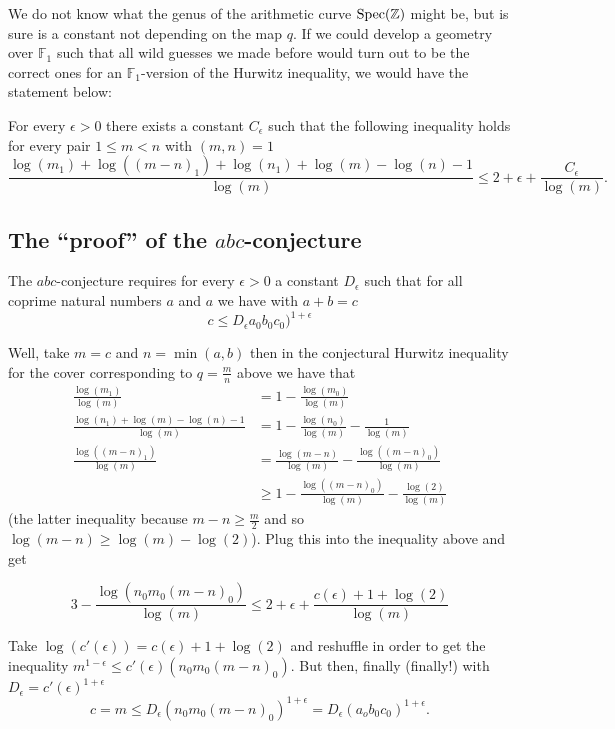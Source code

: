 We do not know what the genus of the arithmetic curve $\operatorname{Spec}(\mathbb{Z})$ might be, but is sure is a constant not depending on the map $q$. If we could develop a geometry over $\mathbb{F}_1$ such that all wild guesses we made before would turn out to be the correct ones for an $\mathbb{F}_1$-version of the Hurwitz inequality, we would have the statement below:

For every $\epsilon > 0$ there exists a constant $C_\epsilon$ such that the following inequality holds for every pair $1 \leq m < n$ with $(m,n)=1$
\begin{equation}
  \frac{\log(m_1) + \log((m-n)_1) + \log(n_1) + \log(m)-\log(n)-1}{\log(m)} \leq 2 + \epsilon + \frac{C_\epsilon}{\log(m)}.
\end{equation}

\subsection{The ``proof'' of the $abc$-conjecture}

The $abc$-conjecture requires for every $\epsilon > 0$ a constant $D_\epsilon$ such that for all coprime natural numbers $a$ and $a$ we have with $a+b=c$
\begin{equation}
c \leq D_\epsilon a_0b_0c_0)^{1+\epsilon}
\end{equation}

Well, take $m=c$ and $n=\min(a,b)$ then in the conjectural Hurwitz inequality for the cover corresponding to $q=\frac{m}{n}$ above we have that
\begin{equation}
  \begin{aligned}
    \frac{\log(m_1)}{\log(m)} &= 1 - \frac{\log(m_0)}{\log(m)} \\
    \frac{\log(n_1)+\log(m)-\log(n)-1}{\log(m)} &= 1 - \frac{\log(n_0)}{\log(m)} - \frac{1}{\log(m)} \\
    \frac{\log((m-n)_1)}{\log(m)}&=\frac{\log(m-n)}{\log(m)}-\frac{\log((m-n)_0)}{\log(m)} \\
    &\geq 1 - \frac{\log((m-n)_0)}{\log(m)} - \frac{\log(2)}{\log(m)}
  \end{aligned}
\end{equation}
(the latter inequality because $m-n \geq \frac{m}{2}$ and so $\log(m-n) \geq \log(m)-\log(2)$). Plug this into the inequality above and get

\begin{equation}
  3-\frac{\log(n_0m_0(m-n)_0)}{\log(m)} \leq 2 + \epsilon + \frac{c(\epsilon) + 1 + \log(2)}{\log(m)}
\end{equation}

Take $\log(c'(\epsilon))=c(\epsilon)+1+\log(2)$ and reshuffle in order to get the inequality $m^{1-\epsilon} \leq c'(\epsilon)(n_0m_0(m-n)_0)$. But then, finally (finally!) with $D_\epsilon=c'(\epsilon)^{1+\epsilon}$
\begin{equation}
  c=m \leq D_\epsilon(n_0m_0(m-n)_0)^{1+\epsilon} = D_\epsilon(a_ob_0c_0)^{1+\epsilon}.
\end{equation}
